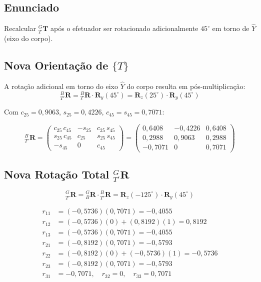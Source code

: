 \documentclass[12pt,a4paper]{article}
\newcommand{\Rot}[2]{{}^{#1}_{#2}\!\mathbf{R}}
\newcommand{\Ry}[1]{\mathbf{R}_y(#1)}
\newcommand{\Rz}[1]{\mathbf{R}_z(#1)}
\newcommand{\degr}{^{\circ}}
\begin{document}
\subsection*{Enunciado}
Recalcular ${}^{G}_{T}\mathbf{T}$ após o efetuador ser rotacionado adicionalmente $45\degr$ em torno de $\hat{Y}$ (eixo do corpo).

\subsection{Nova Orientação de $\{T\}$}

A rotação adicional em torno do eixo $\hat{Y}$ do corpo resulta em pós-multiplicação:
\[
  \Rot{B}{T'} = \Rot{B}{T}\cdot\Ry{45\degr} = \Rz{25\degr}\cdot\Ry{45\degr}
\]

Com $c_{25}=0{,}9063$, $s_{25}=0{,}4226$, $c_{45}=s_{45}=0{,}7071$:

\[
\Rot{B}{T'} =
\begin{pmatrix}
  c_{25}\,c_{45} & -s_{25} & c_{25}\,s_{45} \\
  s_{25}\,c_{45} &  c_{25} & s_{25}\,s_{45} \\
  -s_{45}        &  0      & c_{45}
\end{pmatrix}
=
\begin{pmatrix}
  0{,}6408 & -0{,}4226 & 0{,}6408 \\
  0{,}2988 &  0{,}9063 & 0{,}2988 \\
 -0{,}7071 &  0        & 0{,}7071
\end{pmatrix}
\]

\subsection{Nova Rotação Total ${}^{G}_{T'}\mathbf{R}$}

\[
  \Rot{G}{T'} = \Rot{G}{B}\cdot\Rot{B}{T'} = \Rz{-125\degr}\cdot\Ry{45\degr}
\]

\begin{align*}
  r_{11} &= (-0{,}5736)(0{,}7071) = -0{,}4055 \\
  r_{12} &= (-0{,}5736)(0) + (0{,}8192)(1) = 0{,}8192 \\
  r_{13} &= (-0{,}5736)(0{,}7071) = -0{,}4055 \\
  r_{21} &= (-0{,}8192)(0{,}7071) = -0{,}5793 \\
  r_{22} &= (-0{,}8192)(0) + (-0{,}5736)(1) = -0{,}5736 \\
  r_{23} &= (-0{,}8192)(0{,}7071) = -0{,}5793 \\
  r_{31} &= -0{,}7071,\quad r_{32} = 0,\quad r_{33} = 0{,}7071
\end{align*}
\end{document}
